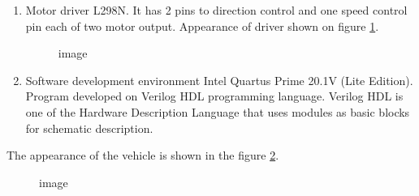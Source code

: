 \documentclass[a4paper,12pt]{article} %
\begin{document}
\begin{enumerate}
	\item
	Motor driver L298N. It has 2 pins to direction control and one speed control pin each of two motor output. Appearance of driver shown on figure \ref{fig:im3}.
	
	\begin{figure}[h]
		\caption{image}
		\label{fig:im3}
	\end{figure}
	
	\item 
	Software development environment Intel Quartus Prime 20.1V (Lite Edition). Program developed on Verilog HDL programming language. Verilog HDL is one of the Hardware Description Language that uses modules as basic blocks for schematic description.
\end{enumerate}

\newpage
The appearance of the vehicle is shown in the figure \ref{fig:vehicle}.

\begin{figure}[h]
	\caption{image}
	\label{fig:vehicle}
\end{figure}
\end{document}
